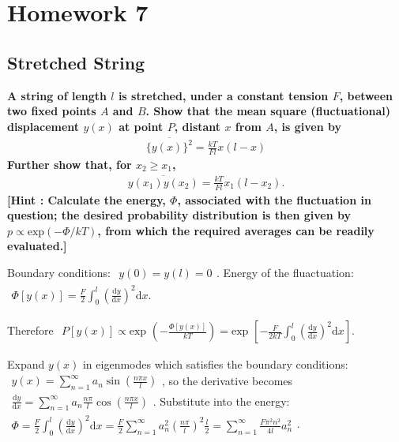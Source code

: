 \documentclass[../../main.tex]{subfiles}
\begin{document}
\section{Homework 7}

\subsection{Stretched String}

\textbf{A string of length $l$ is stretched, under a constant tension $F$, between two fixed points $A$ and $B$. Show that the mean square (fluctuational) displacement $y(x)$ at point $P$, distant $x$ from $A$, is given by
  \begin{align*}
    \overline{\{y(x)\}^{2}} = \frac{kT}{Fl}x(l-x)
  \end{align*}
  Further show that, for $x_{2}\geq x_{1}$,
  \begin{align*}
    \overline{y(x_{1})y(x_{2})} = \frac{kT}{Fl}x_{1}(l-x_{2}).
  \end{align*}
  [Hint : Calculate the energy, $\Phi$, associated with the fluctuation in question; the desired probability distribution is then given by $p\propto \text{exp}(-\Phi/kT)$, from which the required averages can be readily evaluated.]}

  Boundary conditions: $\begin{aligned}
    y(0) = y(l) = 0
  \end{aligned}$. Energy of the fluactuation: $\begin{aligned}
    \Phi[y(x)] = \frac{F}{2}\int_{0}^{l}\left(\frac{\mathrm{d}y}{\mathrm{d}x}\right)^{2}\mathrm{d}x.
  \end{aligned}$

  Therefore $\begin{aligned}
    P[y(x)]\propto \text{exp }\left(-\frac{\Phi[y(x)]}{kT}\right) = \text{exp }\left[-\frac{F}{2kT}\int_{0}^{l}\left(\frac{\mathrm{d}y}{\mathrm{d}x}\right)^{2}\mathrm{d}x\right].
  \end{aligned}$

  Expand $y(x)$ in eigenmodes which satisfies the boundary conditions: $\begin{aligned}
    y(x) = \sum_{n=1}^{\infty}a_{n}\sin{\left(\frac{n\pi x}{l}\right)}
  \end{aligned}$, so the derivative becomes $\begin{aligned}
    \frac{\mathrm{d}y}{\mathrm{d}x} = \sum_{n=1}^{\infty}a_{n}\frac{n\pi}{l}\cos{\left(\frac{n\pi x}{l}\right)}
  \end{aligned}$. Substitute into the energy: $\begin{aligned}
    \Phi = \frac{F}{2}\int_{0}^{l}\left(\frac{\mathrm{d}y}{\mathrm{d}x}\right)^{2}\mathrm{d}x = \frac{F}{2}\sum_{n=1}^{\infty}a_{n}^{2}\left(\frac{n\pi}{l}\right)^{2}\frac{l}{2} = \sum_{n=1}^{\infty}\frac{F\pi^{2}n^{2}}{4l}a_{n}^{2}
  \end{aligned}$.
\end{document}
